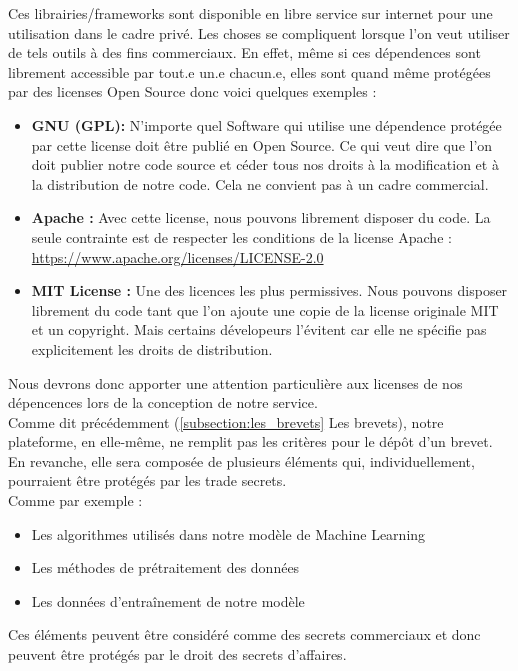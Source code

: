  Ces librairies/frameworks sont disponible en libre service sur internet pour une utilisation dans le cadre privé. Les choses se compliquent lorsque l'on veut utiliser de tels outils à des fins commerciaux. En effet, même si ces dépendences sont librement accessible par tout.e un.e chacun.e, elles sont quand même protégées par des licenses Open Source donc voici quelques exemples : \\
\begin{itemize}
     \item \textbf{GNU (GPL):} N'importe quel Software qui utilise une dépendence protégée par cette license doit être publié en Open Source. Ce qui veut dire que l'on doit publier notre code source et céder tous nos droits à la modification et à la distribution de notre code. Cela ne convient pas à un cadre commercial. \\
     \item \textbf{Apache :} Avec cette license, nous pouvons librement disposer du code. La seule contrainte est de respecter les conditions de la license Apache : \url{https://www.apache.org/licenses/LICENSE-2.0} \\
     \item \textbf{MIT License :} Une des licences les plus permissives. Nous pouvons disposer librement du code tant que l'on ajoute une copie de la license originale MIT et un copyright. Mais certains dévelopeurs l'évitent car elle ne spécifie pas explicitement les droits de distribution. \\
 \end{itemize}

 Nous devrons donc apporter une attention particulière aux licenses de nos dépencences lors de la conception de notre service. \\
 
Comme dit précédemment (\ref{subsection:les_brevets} Les brevets), notre plateforme, en elle-même, ne remplit pas les critères pour le dépôt d'un brevet. En revanche, elle sera composée de plusieurs éléments qui, individuellement, pourraient être protégés par les trade secrets. \\

Comme par exemple :
 \begin{itemize}
     \item Les algorithmes utilisés dans notre modèle de Machine Learning
     \item Les méthodes de prétraitement des données
     \item Les données d'entraînement de notre modèle \\
 \end{itemize}
Ces éléments peuvent être considéré comme des secrets commerciaux et donc peuvent être protégés par le droit des secrets d'affaires.

